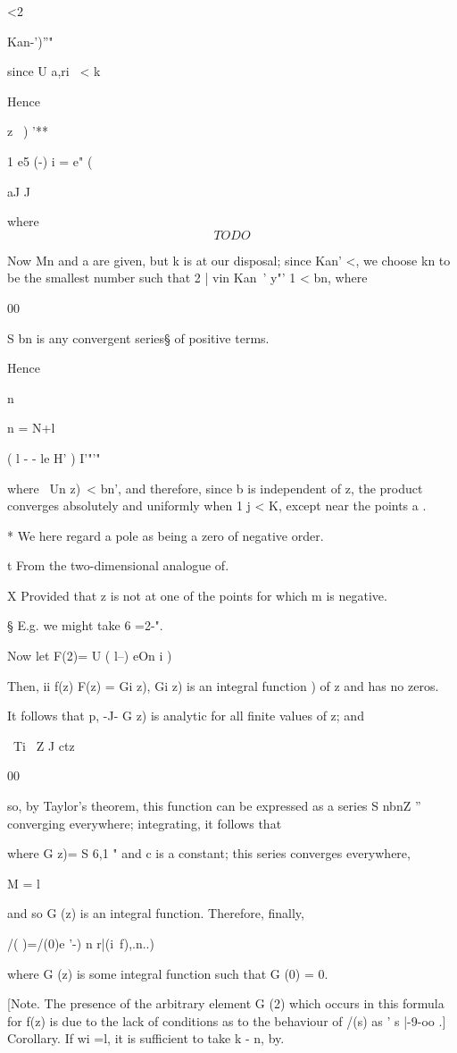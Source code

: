 <2\ \ {Kan-')''"\,

since U a,ri \ < k

Hence

z \ ) '**

1 e5 (-) i = e" (

aJ J

where
$$
TODO
$$

Now Mn and a are given, but k is at our disposal; since Kan' <, we
choose kn to be the smallest number such that 2 | vin Kan~' y"' 1 <
bn, where

00

S bn is any convergent series§ of positive terms.

Hence

n

n = N+l

 ( l - - le H' ) I'"'"

where \ Un z)\ < bn', and therefore, since b is independent of z, the
product converges absolutely and uniformly when 1 j < K, except near
the points a .

* We here regard a pole as being a zero of negative order.

t From the two-dimensional analogue of.

X Provided that z is not at one of the points for which m is negative.

§ E.g. we might take 6 =2-".
%
%

Now let F(2)= U ( l--) eOn i )

Then, ii f(z) F(z) = Gi z), Gi z) is an integral function ) of
z and has no zeros.

It follows that p, -J- G z) is analytic for all finite values of z;
and

\ Ti \ Z J ctz

00

so, by Taylor's theorem, this function can be expressed as a series S
nbnZ ''~ converging everywhere; integrating, it follows that

where G z)= S 6,1 " and c is a constant; this series converges
everywhere,

M = l

and so G (z) is an integral function. Therefore, finally,

/( )=/(0)e '-) n r|(i\ f),.n..)

where G (z) is some integral function such that G (0) = 0.

[Note. The presence of the arbitrary element G (2) which occurs in
this formula for f(z) is due to the lack of conditions as to the
behaviour of /(s) as ' s |-9-oo .] Corollary. If wi =l, it is
sufficient to take k - n, by.

}

